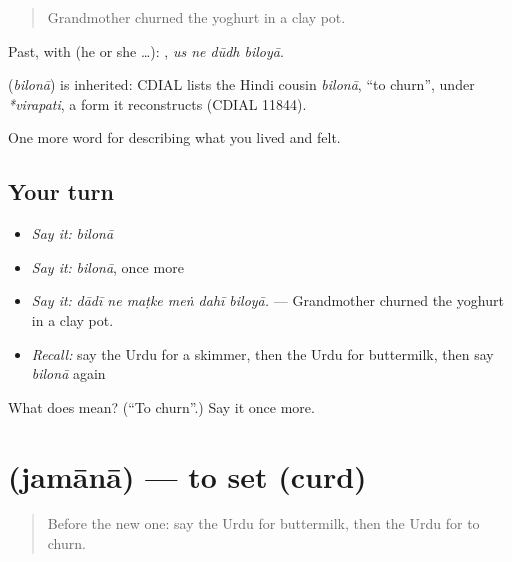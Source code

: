 \begin{quote}
Grandmother churned the yoghurt in a clay pot.
\end{quote}

Past, with  (he or she …):    , \emph{us ne dūdh biloyā}.

\begin{cousinweb}
\textbf{} (\emph{bilonā}) is inherited: CDIAL lists the Hindi cousin \emph{bilonā}, \textquotedblleft{}to churn\textquotedblright{}, under \emph{*virapati}, a form it reconstructs (CDIAL 11844).
\end{cousinweb}

\begin{grammarlens}[title={What you've built}]
One more word for describing what you lived and felt.
\end{grammarlens}

\subsection*{Your turn}
\begin{itemize}
\raggedright
  \item \emph{Say it:} \emph{bilonā}
  \item \emph{Say it:} \emph{bilonā}, once more
  \item \emph{Say it:} \emph{dādī ne maṭke meṅ dahī biloyā.} — Grandmother churned the yoghurt in a clay pot.
  \item \emph{Recall:} say the Urdu for a skimmer, then the Urdu for buttermilk, then say \emph{bilonā} again
\end{itemize}

\begin{tcolorbox}[breakable,colback=teal!4,colframe=teal!35!black,title={Before you move on}]
What does  mean? (\textquotedblleft{}To churn\textquotedblright{}.) Say it once more.
\end{tcolorbox}
\section[\texorpdfstring{\ur{جمانا} (jamānā)}{جمانا (jamānā)}]{ (jamānā) — to set (curd)}

\label{lesson:UR-C509-jamana}



\begin{quote}
Before the new one: say the Urdu for buttermilk, then the Urdu for to churn.
\end{quote}

